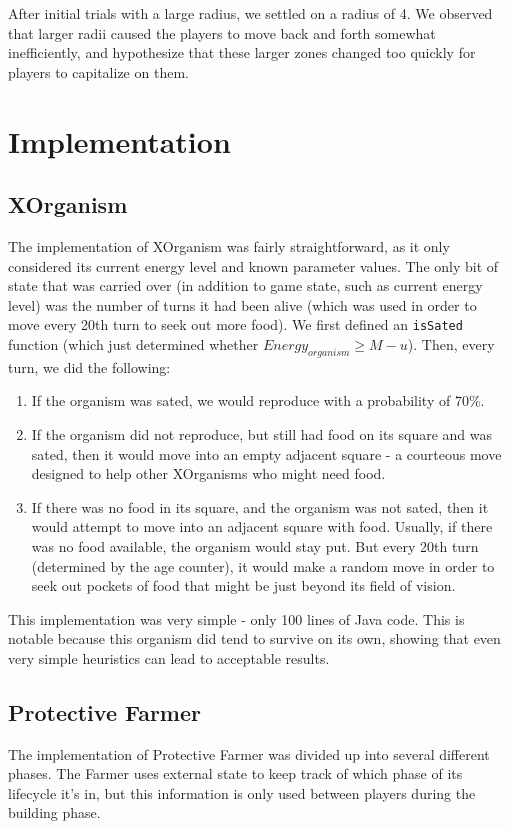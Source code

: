 \documentclass[
10pt, %
letterpaper, %
oneside, %
headinclude,footinclude, %
english
]{article}
\begin{document}
After initial trials with a large radius, we settled on a radius of 4. We observed that larger radii caused the players to move back and forth somewhat inefficiently, and hypothesize that these larger zones changed too quickly for players to capitalize on them.

\section{Implementation}

\subsection{XOrganism}

The implementation of XOrganism was fairly straightforward, as it only considered its current energy level and known parameter values. The only bit of state that was carried over (in addition to game state, such as current energy level) was the number of turns it had been alive (which was used in order to move every 20th turn to seek out more food). We first defined an \texttt{isSated} function (which just determined whether $Energy_{organism} \geq M - u$). Then, every turn, we did the following:

\begin{enumerate}
  \item If the organism was sated, we would reproduce with a probability of 70\%.
  \item If the organism did not reproduce, but still had food on its square and was sated, then it would move into an empty adjacent square - a courteous move designed to help other XOrganisms who might need food.
  \item If there was no food in its square, and the organism was not sated, then it would attempt to move into an adjacent square with food. Usually, if there was no food available, the organism would stay put. But every 20th turn (determined by the age counter), it would make a random move in order to seek out pockets of food that might be just beyond its field of vision.
\end{enumerate}

This implementation was very simple - only 100 lines of Java code. This is notable because this organism did tend to survive on its own, showing that even very simple heuristics can lead to acceptable results.

\subsection{Protective Farmer}
The implementation of Protective Farmer was divided up into several different phases. The Farmer uses external state to keep track of which phase of its lifecycle it's in, but this information is only used between players during the building phase. 
\end{document}
